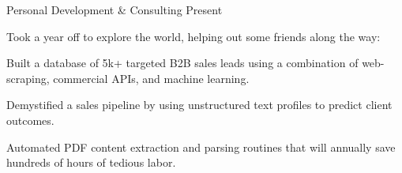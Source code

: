 
\begin{cventries}


  \cventrynew
	{Personal Development \& Consulting}    
    {Present} 
    {}
    {Took a year off to explore the world, helping out some friends along the way:
    \vspace{4.0mm}
    \begin{cvitems}
		 \item {Built a database of 5k+ targeted B2B sales leads using a combination of web-scraping, commercial APIs, and machine learning.}
		 \item {Demystified a sales pipeline by using unstructured text profiles to predict client outcomes.}
		 \item {Automated PDF content extraction and parsing routines that will annually save hundreds of hours of tedious labor.}
      \end{cvitems}
    } 


\end{cventries}
